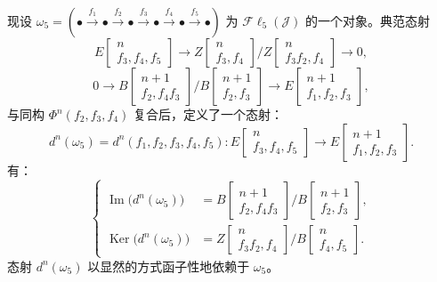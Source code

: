 现设
$\omega_5=(\mathord\bullet\xrightarrow{f_1}\mathord\bullet
\xrightarrow{f_2}\mathord\bullet\xrightarrow{f_3}\mathord\bullet
\xrightarrow{f_4}\mathord\bullet\xrightarrow{f_5}\mathord\bullet)$
为 $\mathcal{F}\ell_5(\mathcal J)$ 的一个对象。典范态射
\[
E\!\begin{bmatrix}n\\ f_3,f_4,f_5\end{bmatrix}
\longrightarrow
Z\!\begin{bmatrix}n\\ f_3,f_4\end{bmatrix}
 \Big/
Z\!\begin{bmatrix}n\\ f_3f_2,f_4\end{bmatrix}
\longrightarrow0,
\]
\[
0\longrightarrow
B\!\begin{bmatrix}n+1\\ f_2,f_4f_3\end{bmatrix}
 \Big/
B\!\begin{bmatrix}n+1\\ f_2,f_3\end{bmatrix}
\longrightarrow
E\!\begin{bmatrix}n+1\\ f_1,f_2,f_3\end{bmatrix},
\]
与同构 $\Phi^n(f_2,f_3,f_4)$ 复合后，定义了一个态射：
\[
d^n(\omega_5)=d^n(f_1,f_2,f_3,f_4,f_5)\colon
E\!\begin{bmatrix}n\\ f_3,f_4,f_5\end{bmatrix}
\longrightarrow
E\!\begin{bmatrix}n+1\\ f_1,f_2,f_3\end{bmatrix}.
\tag{4.2.3.2}
\]
有：
\[
\left\{
\begin{aligned}
\operatorname{Im}\bigl(d^n(\omega_5)\bigr)
 &=B\!\begin{bmatrix}n+1\\ f_2,f_4f_3\end{bmatrix}
   \Big/
   B\!\begin{bmatrix}n+1\\ f_2,f_3\end{bmatrix},\\[2pt]
\operatorname{Ker}\bigl(d^n(\omega_5)\bigr)
 &=Z\!\begin{bmatrix}n\\ f_3f_2,f_4\end{bmatrix}
   \Big/
   B\!\begin{bmatrix}n\\ f_4,f_5\end{bmatrix}.
\end{aligned}
\right.
\tag{4.2.3.3}
\]
态射 $d^n(\omega_5)$ 以显然的方式函子性地依赖于 $\omega_5$。

